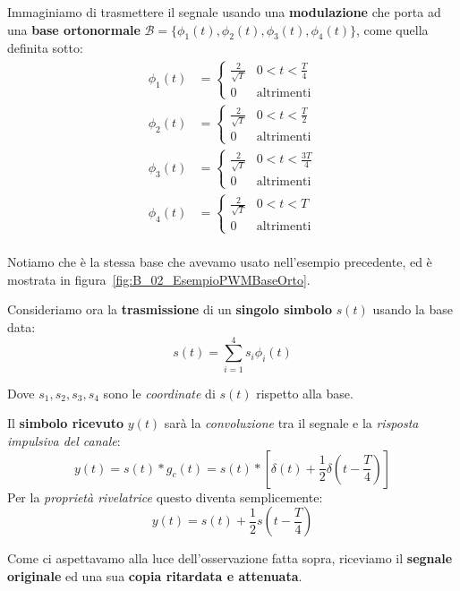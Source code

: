 Immaginiamo di trasmettere il segnale usando una \textbf{modulazione} che porta ad 
una \textbf{base ortonormale} $\mathcal{B} = \{\phi_{1}(t), \phi_{2}(t) , \phi_3(t), \phi_{4}(t)\}$, 
come quella definita sotto:
\[
    \begin{aligned}
        \phi_{1}(t) &= \begin{cases}
            \frac{2}{\sqrt{T}} & 0 < t <\frac{T}{4} \\ 
            0 & \text{altrimenti}
        \end{cases} \\ 
        \phi_{2}(t) &= \begin{cases}
            \frac{2}{\sqrt{T}} & 0 < t <\frac{T}{2} \\ 
            0 & \text{altrimenti}
        \end{cases} \\ 
        \phi_{3}(t) &= \begin{cases}
            \frac{2}{\sqrt{T}} & 0 < t <\frac{3T}{4} \\ 
            0 & \text{altrimenti}
        \end{cases} \\ 
        \phi_{4}(t) &= \begin{cases}
            \frac{2}{\sqrt{T}} & 0 < t < T \\ 
            0 & \text{altrimenti}
        \end{cases} \\ 
    \end{aligned}
\]

Notiamo che è la stessa base che avevamo usato nell'esempio precedente, ed è
mostrata in figura~\ref{fig:B_02_EsempioPWMBaseOrto}.

Consideriamo ora la \textbf{trasmissione} di un \textbf{singolo simbolo} $s(t)$ 
usando la base data:
\[
    s(t) = \sum_{i=1}^4 s_i \phi_i(t)
\]

Dove $s_{1},s_{2},s_{3},s_{4}$ sono le \textit{coordinate} di $s(t)$ rispetto alla base.

Il \textbf{simbolo ricevuto} $y(t)$ sarà la \textit{convoluzione} tra il segnale e la
\textit{risposta impulsiva del canale}:
\[
    y(t) = s(t) \ast g_c(t) = s(t) \ast 
    \left[ \delta(t) + \frac{1}{2}\delta \left( t - \frac{T}{4} \right) \right]
\]
Per la \textit{proprietà rivelatrice} questo diventa semplicemente:
\[
    y(t) = s(t) + \frac{1}{2}s \left( t - \frac{T}{4} \right)
\]

\begin{remark}
    Come ci aspettavamo alla luce dell'osservazione fatta sopra, riceviamo
    il \textbf{segnale originale} ed una sua \textbf{copia ritardata e attenuata}.
\end{remark}

